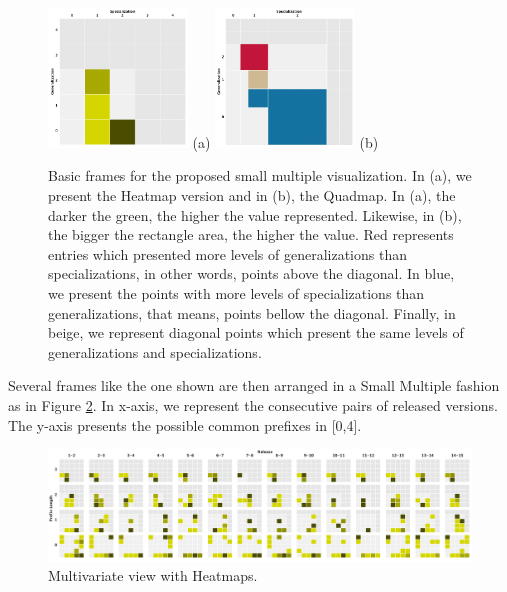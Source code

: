 \begin{figure}[htb]
  \centering
  \includegraphics[width=3.7cm]{images/techniquea.png} (a) 
  \includegraphics[width=3.7cm]{images/techniqueb.png} (b)
  \caption{Basic frames for the proposed small multiple visualization. In (a), we present the Heatmap version and in (b), the Quadmap. In (a),  the darker the green, the higher the value represented. Likewise, in (b), the bigger the rectangle area, the higher the value. Red represents entries which presented more levels of generalizations than specializations, in other words, points above the diagonal. In blue, we present the points with more levels of specializations than generalizations, that means, points bellow  the diagonal. Finally, in beige, we represent diagonal points which present the same levels of generalizations and specializations.}
  \label{fig:technique}
\end{figure}

Several frames like the one shown are then arranged in a Small Multiple fashion as in Figure \ref{fig:heatmap000}. In x-axis, we represent the consecutive pairs of released versions. The y-axis presents the possible common prefixes in [0,4]. 

\begin{figure}[htb]
  \centering
  \includegraphics[width=17cm]{images/heatmap000.png}
  \caption{Multivariate view with Heatmaps.}
  \label{fig:heatmap000}
\end{figure}

